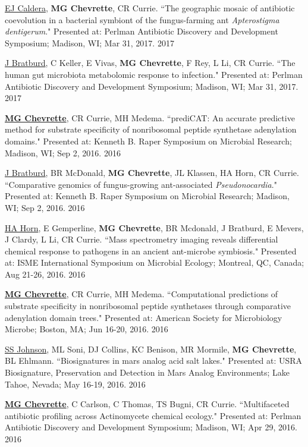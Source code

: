 \begin{cvpubs}
\cvpub
{\underline{EJ Caldera}, \textbf{MG Chevrette}, CR Currie. ``The geographic mosaic of antibiotic coevolution in a bacterial symbiont of the fungus-farming ant \textit{Apterostigma dentigerum}." Presented at: Perlman Antibiotic Discovery and Development Symposium; Madison, WI; Mar 31, 2017.}
{2017}

\cvpub
{\underline{J Bratburd}, C Keller, E Vivas, \textbf{MG Chevrette}, F Rey, L Li, CR Currie. ``The human gut microbiota metabolomic response to infection." Presented at: Perlman Antibiotic Discovery and Development Symposium; Madison, WI; Mar 31, 2017.}
{2017}

\cvpub
{\textbf{\underline{MG Chevrette}}, CR Currie, MH Medema.  ``prediCAT: An accurate predictive method for substrate specificity of nonribosomal peptide synthetase adenylation domains." Presented at: Kenneth B. Raper Symposium on Microbial Research; Madison, WI; Sep 2, 2016.}
{2016}

\cvpub
{\underline{J Bratburd}, BR McDonald, \textbf{MG Chevrette}, JL Klassen, HA Horn, CR Currie. ``Comparative genomics of fungus-growing ant-associated \textit{Pseudonocardia}." Presented at: Kenneth B. Raper Symposium on Microbial Research; Madison, WI; Sep 2, 2016.}
{2016}

\cvpub
{\underline{HA Horn}, E Gemperline, \textbf{MG Chevrette}, BR Mcdonald, J Bratburd, E Mevers, J Clardy, L Li, CR Currie. ``Mass spectrometry imaging reveals differential chemical response to pathogens in an ancient ant-microbe symbiosis." Presented at: ISME International Symposium on Microbial Ecology; Montreal, QC, Canada; Aug 21-26, 2016.}
{2016}

\cvpub
{\textbf{\underline{MG Chevrette}}, CR Currie, MH Medema.  ``Computational predictions of substrate specificity in nonribosomal peptide synthetases through comparative adenylation domain trees." Presented at: American Society for Microbiology Microbe; Boston, MA; Jun 16-20, 2016.}
{2016}

\cvpub
{\underline{SS Johnson}, ML Soni, DJ Collins, KC Benison, MR Mormile, \textbf{MG Chevrette}, BL Ehlmann. ``Biosignatures in mars analog acid salt lakes." Presented at: USRA Biosignature, Preservation and Detection in Mars Analog Environments; Lake Tahoe, Nevada; May 16-19, 2016.}
{2016}

\cvpub
{\textbf{\underline{MG Chevrette}}, C Carlson, C Thomas, TS Bugni, CR Currie. ``Multifaceted antibiotic profiling across Actinomycete chemical ecology." Presented at: Perlman Antibiotic Discovery and Development Symposium; Madison, WI; Apr 29, 2016.}
{2016}


\end{cvpubs}
